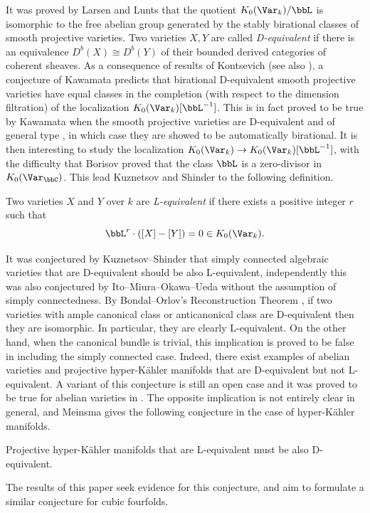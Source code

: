 \documentclass{amsart}
\begin{document}
It was proved by Larsen and Lunts \cite{LarsenLunts:motivic} that the quotient \(K_0(\Var_k)/\bbL\) is isomorphic to the free abelian group generated by the stably birational classes of smooth projective varieties. Two varieties \(X,Y\) are called \textit{D-equivalent} if there is an equivalence \(D^b(X)\cong D^b(Y)\) of their bounded derived categories of coherent sheaves. As a consequence of results of Kontsevich \cite{Kontsevich:motivic_integration} (see also \cite[4.1]{Veys_motivic_integration}), a conjecture of Kawamata \cite[Conjecture 1.2]{kawamata2002d} predicts that birational D-equivalent smooth projective varieties have equal classes in the completion (with respect to the dimension filtration) of the localization \(K_0(\Var_k)[\bbL^{-1}]\). This is in fact proved to be true by Kawamata when the smooth projective varieties are D-equivalent and of general type \cite[Theorem 1.4 (2)]{kawamata2002d}, in which case they are showed to be automatically birational. It is then interesting to study the localization \(K_0(\Var_k)\to K_0(\Var_k)[\bbL^{-1}]\), with the difficulty that Borisov proved \cite{Borisov:class_of_affine_line} that the class \(\bbL\) is a zero-divisor in \(K_0(\Var_{\bbC})\). This lead Kuznetsov and Shinder to the following definition.
\begin{definition}
    Two varieties \(X\) and \(Y\) over \(k\) are \textit{L-equivalent} if there exists a positive integer \(r\) such that \[\bbL^{r}\cdot ([X]-[Y])=0\in K_0(\Var_k).\]
\end{definition}
 It was conjectured by Kuznetsov--Shinder \cite[Conjecture 1.6]{kuznetsov2018grothendieck} that simply connected algebraic varieties that are D-equivalent should be also L-equivalent, independently this was also conjectured by Ito--Miura--Okawa--Ueda \cite[Problem 1.2]{ito2020derived} without the assumption of simply connectedness.
By Bondal--Orlov's Reconstruction Theorem \cite[Theorem 2.5]{BondalOrlov}, if two varieties with ample canonical class or anticanonical class are D-equivalent then they are isomorphic. In particular, they are clearly L-equivalent. On the other hand, when the canonical bundle is trivial, this implication is proved to be false in \cite{efimov2018some,ito2020derived,meinsma2025counterexamples} including the simply connected case. Indeed, there exist examples of abelian varieties and projective hyper-Kähler manifolds that are D-equivalent but not L-equivalent. A variant of this conjecture \cite[Problem 7.2]{ito2020derived} is still an open case and it was proved to be true for abelian varieties in \cite{caucci2023derived}. The opposite implication is not entirely clear in general, and Meinsma gives the following conjecture in the case of hyper-Kähler manifolds.
\begin{conjecture}
   Projective hyper-Kähler manifolds that are L-equivalent must be also D-equivalent.
\end{conjecture}
The results of this paper seek evidence for this conjecture, and aim to formulate a similar conjecture for cubic fourfolds.
\end{document}
